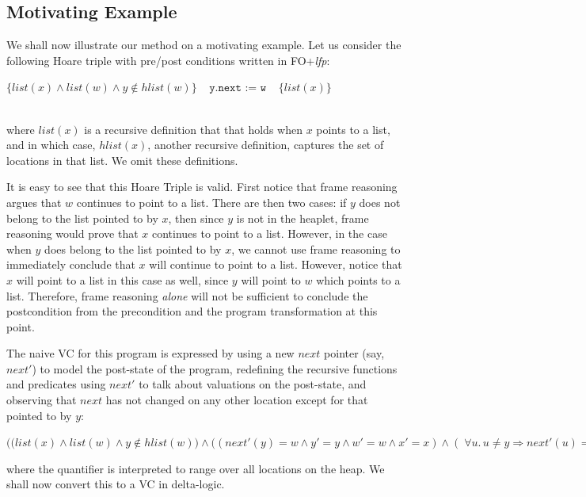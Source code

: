 \subsection{Motivating Example}
\label{sec:motivating_example}
We shall now illustrate our method on a motivating example.
Let us consider the following Hoare triple with pre/post conditions written in FO+\textit{lfp}:\\
\centerline{$ \{ list(x) \wedge  list(w) \wedge  y \not \in hlist(w) \} 
~~~~~\texttt{y.next := w}~~~~~
\{list(x) \}$}\\
where $list(x)$ is a recursive definition that that holds when $x$ points to a list, and in which
case, $hlist(x)$, another recursive definition, captures the set of locations in that list. We omit these definitions.

It is easy to see that this Hoare Triple is valid. First notice that frame reasoning argues that $w$ continues to point to a list.
There are then two cases: if $y$ does not belong to the list pointed to by $x$, then since $y$ is not in the heaplet, frame reasoning would prove that $x$ continues to point to a list.
However, in the case when $y$ does belong to the list pointed to by $x$, we cannot use frame reasoning to immediately conclude that $x$ will continue to point to a list. However, notice that $x$ will point to a list in this case as well, since $y$ will point to $w$ which points to a list. Therefore, frame reasoning \emph{alone} will not be sufficient to conclude the postcondition from the precondition and the program transformation at this point. 

The naive VC for this program is expressed by using a new $next$ pointer (say, $next'$) to model the post-state of the program, redefining the recursive functions and predicates using $next'$ to talk about valuations on the post-state, and observing that $next$ has not changed on any other location except for that pointed to by $y$:

\begin{center}
$\Big( \big( list(x) \wedge  list(w) \wedge  y \not \in hlist(w) \big) \land{} \big( \left(next'(y) = w \land{} y' = y \land{} w' = w \land{} x' = x\right) \land{} \left(\; \forall{}u.\, u\neq{}y \Rightarrow{} next'(u) = next(u)\; \right) \big) \Big) \Rightarrow{} \left(list'(x')\right)$
\end{center}
where the quantifier is interpreted to range over all locations on the heap. We shall now convert this to a VC in delta-logic.

